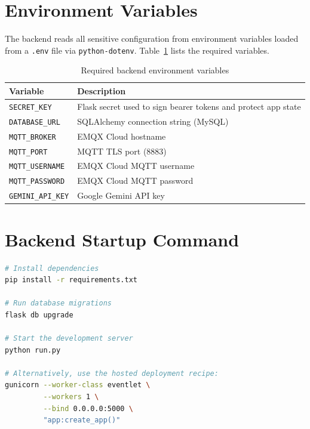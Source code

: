 \section{Environment Variables}

The backend reads all sensitive configuration from environment variables loaded from a \texttt{.env} file via \texttt{python-dotenv}. Table~\ref{tab:env} lists the required variables.

\begin{table}[ht]
\centering
\caption{Required backend environment variables}
\label{tab:env}
\begin{tabular}{ll}
\toprule
\textbf{Variable}       & \textbf{Description} \\
\midrule
\texttt{SECRET\_KEY}         & Flask secret used to sign bearer tokens and protect app state \\
\texttt{DATABASE\_URL}       & SQLAlchemy connection string (MySQL) \\
\texttt{MQTT\_BROKER}        & EMQX Cloud hostname \\
\texttt{MQTT\_PORT}          & MQTT TLS port (8883) \\
\texttt{MQTT\_USERNAME}      & EMQX Cloud MQTT username \\
\texttt{MQTT\_PASSWORD}      & EMQX Cloud MQTT password \\
\texttt{GEMINI\_API\_KEY}    & Google Gemini API key \\
\bottomrule
\end{tabular}
\end{table}

\section{Backend Startup Command}

\begin{lstlisting}[style=mystyle, language=bash,
  caption={Starting the Flask backend in development and hosted deployment},
  label={lst:startup}]
# Install dependencies
pip install -r requirements.txt

# Run database migrations
flask db upgrade

# Start the development server
python run.py

# Alternatively, use the hosted deployment recipe:
gunicorn --worker-class eventlet \
         --workers 1 \
         --bind 0.0.0.0:5000 \
         "app:create_app()"
\end{lstlisting}

